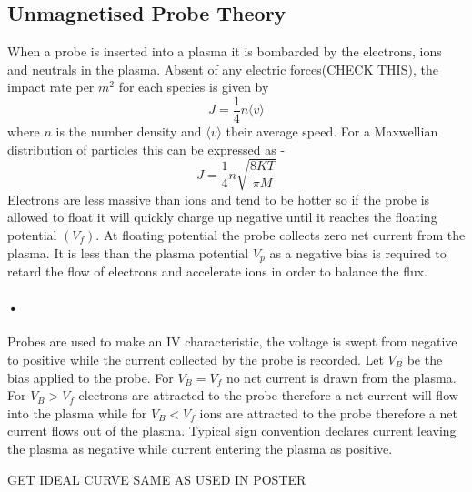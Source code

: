 \documentclass[12pt]{article}
\def\be{\begin{equation}}
\def\ee{\end{equation}}
\begin{document}
\subsection{Unmagnetised Probe Theory}
When a probe is inserted into a plasma it is bombarded by the electrons, ions and neutrals in the plasma. Absent of any electric forces(CHECK THIS), the impact rate per $m^2$ for each species is given by 
\be 
J = \frac{1}{4} n \langle{v}\rangle 
\ee
where $n$ is the number density and $\langle{v}\rangle$ their average speed. For a Maxwellian distribution of particles this can be expressed as - 
\be 
J =  \frac{1}{4} n \sqrt{\frac{8 K T}{\pi M}}
\ee
Electrons are less massive than ions and tend to be hotter so if the probe is allowed to float it will quickly charge up negative until it reaches the floating potential $(V_f)$. At floating potential the probe collects zero net current from the plasma. It is less than the plasma potential $V_p$ as a negative bias is required to retard the flow of electrons and accelerate ions in order to balance the flux.
\paragraph{•}
Probes are used to make an IV characteristic, the voltage is swept from negative to positive while the current collected by the probe is recorded. Let $V_B$ be the bias applied to the probe. For $V_B =V_f$ no net current is drawn from the plasma. For $V_B > V_f$ electrons are attracted to the probe therefore a net current will flow into the plasma while for $V_B <V_f$ ions are attracted to the probe therefore a net current flows out of the plasma. Typical sign convention declares current leaving the plasma as negative while current entering the plasma as positive. 

GET IDEAL CURVE SAME AS USED IN POSTER
\end{document}
